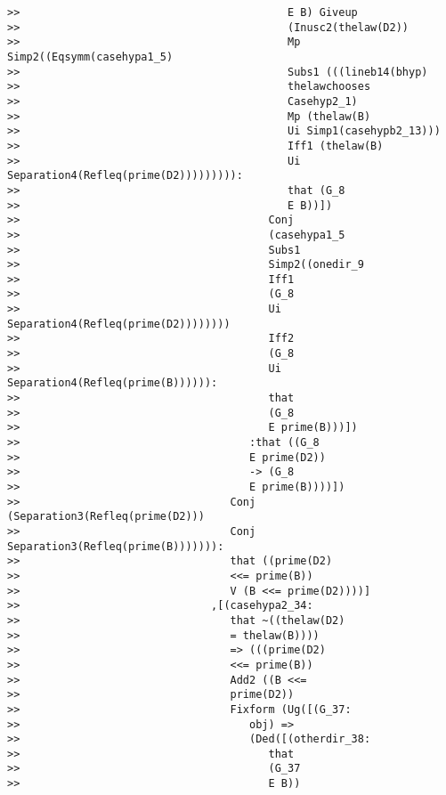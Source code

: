 \documentclass[12pt]{article}
\begin{document}
\begin{verbatim}
>>                                          E B) Giveup
>>                                          (Inusc2(thelaw(D2))
>>                                          Mp Simp2((Eqsymm(casehypa1_5)
>>                                          Subs1 (((lineb14(bhyp)
>>                                          thelawchooses
>>                                          Casehyp2_1)
>>                                          Mp (thelaw(B)
>>                                          Ui Simp1(casehypb2_13)))
>>                                          Iff1 (thelaw(B)
>>                                          Ui Separation4(Refleq(prime(D2))))))))):
>>                                          that (G_8
>>                                          E B))])
>>                                       Conj
>>                                       (casehypa1_5
>>                                       Subs1
>>                                       Simp2((onedir_9
>>                                       Iff1
>>                                       (G_8
>>                                       Ui Separation4(Refleq(prime(D2))))))))
>>                                       Iff2
>>                                       (G_8
>>                                       Ui Separation4(Refleq(prime(B)))))):
>>                                       that
>>                                       (G_8
>>                                       E prime(B)))])
>>                                    :that ((G_8
>>                                    E prime(D2))
>>                                    -> (G_8
>>                                    E prime(B))))])
>>                                 Conj (Separation3(Refleq(prime(D2)))
>>                                 Conj Separation3(Refleq(prime(B))))))):
>>                                 that ((prime(D2)
>>                                 <<= prime(B))
>>                                 V (B <<= prime(D2))))]
>>                              ,[(casehypa2_34:
>>                                 that ~((thelaw(D2)
>>                                 = thelaw(B))))
>>                                 => (((prime(D2)
>>                                 <<= prime(B))
>>                                 Add2 ((B <<=
>>                                 prime(D2))
>>                                 Fixform (Ug([(G_37:
>>                                    obj) =>
>>                                    (Ded([(otherdir_38:
>>                                       that
>>                                       (G_37
>>                                       E B))

\end{verbatim}
\end{document}
